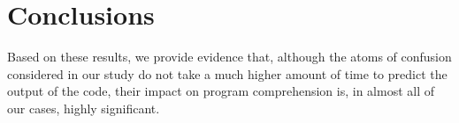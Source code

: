 \section{Conclusions}
\label{conclusion}


{\color{blue}Based on these results, we provide evidence that, although the atoms of confusion considered in our study do not take a much higher amount of time to predict the output of the code, their impact on program comprehension is, in almost all of our cases, highly significant.}